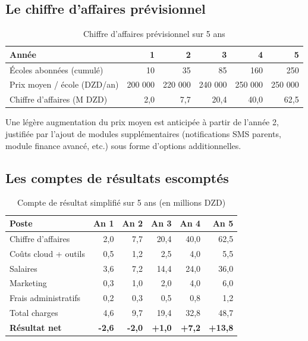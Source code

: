 \documentclass[12pt,a4paper,oneside]{report}
\begin{document}
\subsection{Le chiffre d'affaires prévisionnel}

\begin{table}[H]
\centering
\caption{Chiffre d'affaires prévisionnel sur 5 ans}
\label{tab:ca_previsionnel}
\begin{tabular}{lrrrrr}
\toprule
\textbf{Année} & \textbf{1} & \textbf{2} & \textbf{3} & \textbf{4} & \textbf{5} \\
\midrule
Écoles abonnées (cumulé) & 10 & 35 & 85 & 160 & 250 \\
Prix moyen / école (DZD/an) & 200 000 & 220 000 & 240 000 & 250 000 & 250 000 \\
Chiffre d'affaires (M DZD) & 2,0 & 7,7 & 20,4 & 40,0 & 62,5 \\
\bottomrule
\end{tabular}
\end{table}

Une légère augmentation du prix moyen est anticipée à partir de l'année 2, justifiée par l'ajout de modules supplémentaires (notifications SMS parents, module finance avancé, etc.) sous forme d'options additionnelles.

\subsection{Les comptes de résultats escomptés}

\begin{table}[H]
\centering
\caption{Compte de résultat simplifié sur 5 ans (en millions DZD)}
\label{tab:compte_resultat}
\begin{tabular}{lrrrrr}
\toprule
\textbf{Poste} & \textbf{An 1} & \textbf{An 2} & \textbf{An 3} & \textbf{An 4} & \textbf{An 5} \\
\midrule
Chiffre d'affaires & 2,0 & 7,7 & 20,4 & 40,0 & 62,5 \\
\midrule
Coûts cloud + outils & 0,5 & 1,2 & 2,5 & 4,0 & 5,5 \\
Salaires & 3,6 & 7,2 & 14,4 & 24,0 & 36,0 \\
Marketing & 0,3 & 1,0 & 2,0 & 4,0 & 6,0 \\
Frais administratifs & 0,2 & 0,3 & 0,5 & 0,8 & 1,2 \\
\midrule
Total charges & 4,6 & 9,7 & 19,4 & 32,8 & 48,7 \\
\midrule
\textbf{Résultat net} & \textbf{-2,6} & \textbf{-2,0} & \textbf{+1,0} & \textbf{+7,2} & \textbf{+13,8} \\
\bottomrule
\end{tabular}
\end{table}
\end{document}
